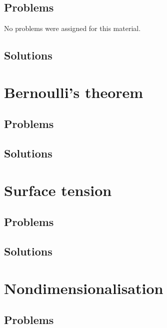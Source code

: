       \section{Problems}
         No problems were assigned for this material.
      \section{Solutions}
         \shipoutAnswer

   \chapter{Bernoulli's theorem}
      
      
      \section{Problems}
         
         
      \section{Solutions}
         \shipoutAnswer

   \chapter{Surface tension}
      
      \section{Problems}
         
      \section{Solutions}
         \shipoutAnswer

   \chapter{Nondimensionalisation}
      
      
      
      \section{Problems}
         
